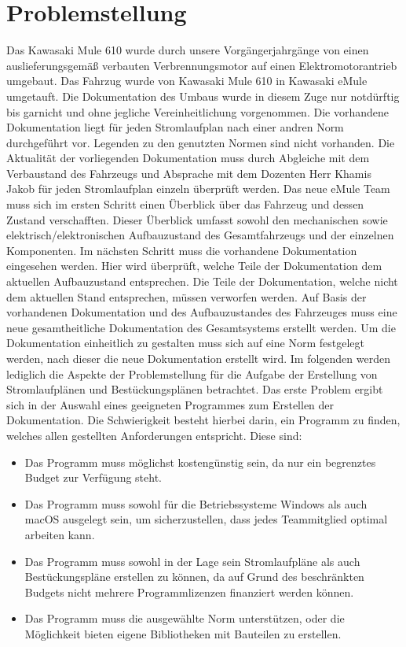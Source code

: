 \section*{Problemstellung}
Das Kawasaki Mule 610 wurde durch unsere Vorgängerjahrgänge von einen auslieferungsgemäß verbauten Verbrennungsmotor auf einen Elektromotorantrieb umgebaut. Das Fahrzug wurde von \glqq Kawasaki Mule 610 \grqq in \glqq Kawasaki eMule \grqq umgetauft. Die Dokumentation des Umbaus wurde in diesem Zuge nur notdürftig bis garnicht und ohne jegliche Vereinheitlichung vorgenommen. Die vorhandene Dokumentation liegt für jeden Stromlaufplan nach einer andren Norm durchgeführt vor. Legenden zu den genutzten Normen sind nicht vorhanden. Die Aktualität der vorliegenden Dokumentation muss durch Abgleiche mit dem Verbaustand des Fahrzeugs und Absprache mit dem Dozenten Herr Khamis Jakob für jeden Stromlaufplan einzeln überprüft werden.  Das neue eMule Team muss sich im ersten Schritt einen Überblick über das Fahrzeug und dessen Zustand verschafften. Dieser Überblick umfasst sowohl den mechanischen sowie elektrisch/elektronischen Aufbauzustand des Gesamtfahrzeugs und der einzelnen Komponenten. Im nächsten Schritt muss die vorhandene Dokumentation eingesehen werden. Hier wird überprüft, welche Teile der Dokumentation dem aktuellen Aufbauzustand entsprechen. Die Teile der Dokumentation, welche nicht dem aktuellen Stand entsprechen, müssen verworfen werden. Auf Basis der vorhandenen Dokumentation und des Aufbauzustandes des Fahrzeuges muss eine neue gesamtheitliche Dokumentation des Gesamtsystems erstellt werden. Um die Dokumentation einheitlich zu gestalten muss sich auf eine Norm festgelegt werden, nach dieser die neue Dokumentation erstellt wird.  Im folgenden werden lediglich die Aspekte der Problemstellung für die Aufgabe der Erstellung von Stromlaufplänen und Bestückungsplänen betrachtet. Das erste Problem ergibt sich in der Auswahl eines geeigneten Programmes zum Erstellen der Dokumentation. Die Schwierigkeit besteht hierbei darin, ein Programm zu finden, welches allen gestellten Anforderungen entspricht. Diese sind: 
\begin{itemize}
	\item Das Programm muss möglichst kostengünstig sein, da nur ein begrenztes Budget zur Verfügung steht.
	\item Das Programm muss sowohl für die Betriebssysteme Windows als auch macOS ausgelegt sein, um sicherzustellen, dass jedes Teammitglied optimal arbeiten kann.
	\item Das Programm muss sowohl in der Lage sein Stromlaufpläne als auch Bestückungspläne erstellen zu können, da auf Grund des beschränkten Budgets nicht mehrere Programmlizenzen finanziert werden können.
	\item Das Programm muss die ausgewählte Norm unterstützen, oder die Möglichkeit bieten eigene Bibliotheken mit Bauteilen zu erstellen.
\end{itemize}   
